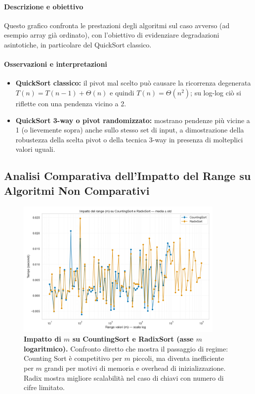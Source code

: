\documentclass[a4paper, 11pt]{article}
\begin{document}
\paragraph{Descrizione e obiettivo}
Questo grafico confronta le prestazioni degli algoritmi sul caso avverso (ad esempio array già ordinato), con l'obiettivo di evidenziare degradazioni asintotiche, in particolare del QuickSort classico.

\paragraph{Osservazioni e interpretazioni}
\begin{itemize}
  \item \textbf{QuickSort classico:} il pivot mal scelto può causare la ricorrenza degenerata \(T(n)=T(n-1)+\Theta(n)\) e quindi \(T(n)=\Theta(n^2)\); su log-log ciò si riflette con una pendenza vicino a 2.
  \item \textbf{QuickSort 3-way o pivot randomizzato:} mostrano pendenze più vicine a 1 (o lievemente sopra) anche sullo stesso set di input, a dimostrazione della robustezza della scelta pivot o della tecnica 3-way in presenza di molteplici valori uguali.
\end{itemize}

\subsection{Analisi Comparativa dell'Impatto del Range su Algoritmi Non Comparativi}
\begin{figure}[H]
\centering
\includegraphics[width=0.9\textwidth]{./Immagini/impatto_m_counting_radix_improved.png}
\caption*{\textbf{Impatto di \(m\) su CountingSort e RadixSort (asse \(m\) logaritmico).} Confronto diretto che mostra il passaggio di regime: Counting Sort è competitivo per \(m\) piccoli, ma diventa inefficiente per \(m\) grandi per motivi di memoria e overhead di inizializzazione. Radix mostra migliore scalabilità nel caso di chiavi con numero di cifre limitato.}
\label{fig:impatto_m_count_radix}
\end{figure}
\end{document}
